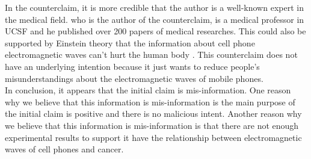\documentclass[a4paper, 12pt]{article}
\begin{document}
\begin{CJK*}{UTF8}{bsmi}
    In the counterclaim, it is more credible that the author is a 
    well-known expert in the medical field. \parencite{20210822} who
    is the author of the counterclaim, is a medical professor
    in UCSF and he published over 200 papers of medical researches.
    This could also be supported by Einstein theory that the
    information about cell phone electromagnetic waves can’t hurt the
    human body \parencite{Einstein} . This counterclaim does not
    have an underlying intention because it just wants to reduce
    people’s misunderstandings about the electromagnetic waves
    of mobile phones.\\

    In conclusion, it appears that the initial claim is
    mis-information. One reason why we believe that this information
    is mis-information is the main purpose of the initial claim
    is positive and there is no malicious intent. Another reason
    why we believe that this information is mis-information is that
    there are not enough experimental results to support it have
    the relationship between electromagnetic waves of cell phones
    and cancer.

    \printbibliography[title=REFERENCES]

\end{CJK*}
\end{document}
